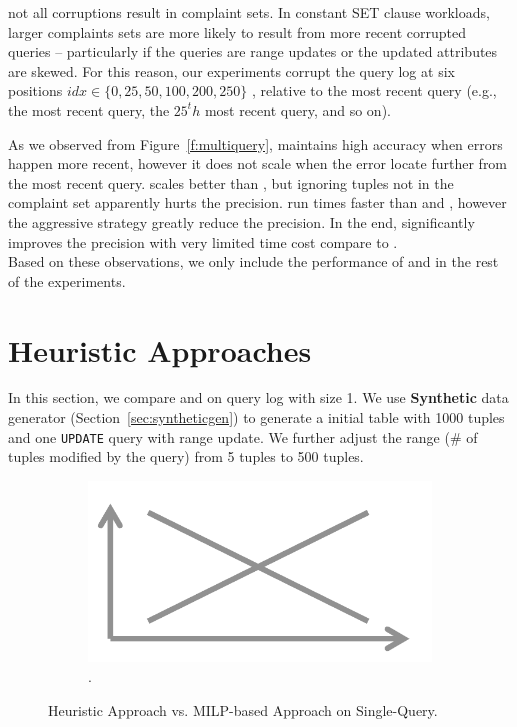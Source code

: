 not all corruptions result in complaint sets.
In constant SET clause workloads, larger complaints sets are more likely to
result from more recent corrupted queries -- particularly if the queries are range updates or
the updated attributes are skewed.
For this reason, our experiments corrupt the query log at six positions 
$idx \in \{0, 25, 50, 100, 200, 250\}$ , relative 
to the most recent query (e.g., the most recent query, the $25^th$ most recent query, and so on).



As we observed from Figure~\ref{f:multiquery}, \milpall maintains high accuracy when errors
happen more recent, however it does not scale when the error locate further from the most
recent query. \milptuple scales better than \milpall, but ignoring tuples not 
in the complaint set apparently hurts the precision. \milptuplestopearly run times faster
than \milpall and \milptuple, however the aggressive strategy greatly reduce the 
precision. In the end, \milpadvtuple significantly improves the precision with very limited
time cost compare to \milptuple. \\
Based on these observations, we only include the performance of \milpadvtuple and \milpadvall
in the rest of the experiments. 


\section{Heuristic Approaches}
In this section, we compare \heurstic and \milpall on query log with size 1. 
We use \textbf{Synthetic} data generator (Section~\ref{sec:syntheticgen}) 
to generate a initial table with 1000 tuples and one 
\texttt{UPDATE} query with range update. 
We further adjust the range (\# of tuples modified by the query) 
from 5 tuples to 500 tuples. 

 \begin{figure}[h]
\centering
  \begin{subfigure}[t]{.48\columnwidth}
  \includegraphics[width = .95\columnwidth]{figures/placeholder}
  \caption{.}
  \label{f:heursticvsmilp} 
  \end{subfigure}
  \caption{Heuristic Approach vs. MILP-based Approach on Single-Query. }
\end{figure}



